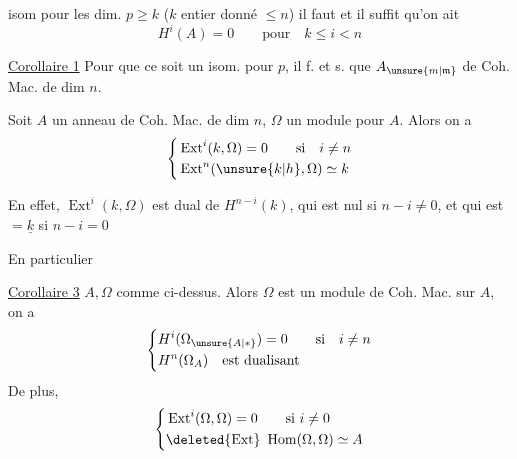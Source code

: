 \noindent\llap{\smash{\raisebox{-0.7\baselineskip}{\rule{0.4pt}{1.6\baselineskip}}}\quad}
isom pour les dim. $p\geq k$ ($k$ entier donné $\leq n$)
il faut et il suffit qu'on ait
\[
H^i(A)=0\qquad\text{pour}\quad k\leq i<n
\]

\noindent\llap{\smash{\raisebox{-2.1\baselineskip}{\rule{0.4pt}{2.2\baselineskip}}}\quad}
\uline{Corollaire 1} Pour que ce soit un isom. pour
 $p$, il f. et s. que  $A_{\unsure{m|\mathfrak m}}$  
  de Coh. Mac. de dim $n$.


 Soit $A$ un anneau  de Coh.
Mac. de dim $n$, $\Omega$ un module 
pour $A$. Alors on a
\[
\left\{\begin{aligned}
&\operatorname{Ext}^i(k,\Omega)=0\qquad \text{si}\quad i\ne n\\
&\operatorname{Ext}^n(\unsure{k|h},\Omega)\simeq k
\end{aligned}\right.
\]

\margin{\unsure{\S|$\{$}}
En effet, $\operatorname{Ext}^i(k,\Omega)$ est dual de $H^{n-i}(k)$, qui
est nul si $n-i\ne0$, et qui est $=\underline{k}$ si $n-i=0$

En particulier

\uline{Corollaire 3} $A,\Omega$ comme ci-dessus. Alors $\Omega$
est un module de Coh. Mac.  sur $A$, on a
\[
\left\{\begin{aligned}
&H^i(\Omega_{\unsure{A|*}})=0\qquad \text{si}\quad i\ne n\\
&H^n(\Omega_A)\quad\text{est dualisant}
\end{aligned}\right.
\]
De plus, 
\[
\left\{\begin{aligned}
&\operatorname{Ext}^i(\Omega,\Omega)=0\qquad\text{si }i\ne0\\
&\deleted{\operatorname{Ext}}\ \operatorname{Hom}(\Omega,\Omega)\simeq A
\end{aligned}\right.
\]

